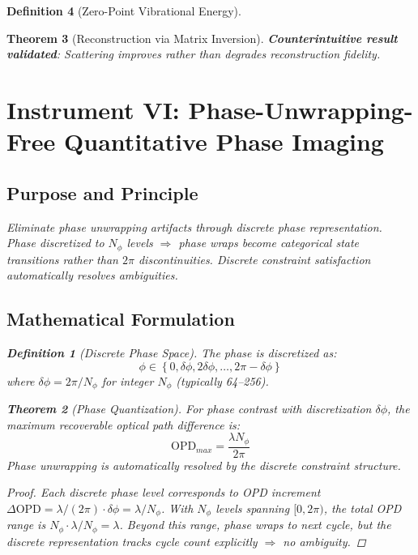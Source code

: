 \documentclass[11pt,a4paper]{article}
\newtheorem{theorem}{Theorem}[section]
\theoremstyle{definition}
\newtheorem{definition}[theorem]{Definition}
\theoremstyle{remark}
\begin{document}
\begin{definition}[Zero-Point Vibrational Energy]
\begin{theorem}[Reconstruction via Matrix Inversion]
\textbf{Counterintuitive result validated}: Scattering improves rather than degrades reconstruction fidelity.

\section{Instrument VI: Phase-Unwrapping-Free Quantitative Phase Imaging}
\label{sec:instrument6}

\subsection{Purpose and Principle}

Eliminate phase unwrapping artifacts through discrete phase representation. Phase discretized to $N_\phi$ levels $\Rightarrow$ phase wraps become categorical state transitions rather than $2\pi$ discontinuities. Discrete constraint satisfaction automatically resolves ambiguities.

\subsection{Mathematical Formulation}

\begin{definition}[Discrete Phase Space]
\label{def:discrete_phase}
The phase is discretized as:
\begin{equation}
\phi \in \left\{0, \delta\phi, 2\delta\phi, \ldots, 2\pi - \delta\phi\right\}
\end{equation}
where $\delta\phi = 2\pi/N_\phi$ for integer $N_\phi$ (typically 64--256).
\end{definition}

\begin{theorem}[Phase Quantization]
\label{thm:phase_quantization}
For phase contrast with discretization $\delta\phi$, the maximum recoverable optical path difference is:
\begin{equation}
\text{OPD}_{max} = \frac{\lambda N_\phi}{2\pi}
\end{equation}
Phase unwrapping is automatically resolved by the discrete constraint structure.
\end{theorem}

\begin{proof}
Each discrete phase level corresponds to OPD increment $\Delta \text{OPD} = \lambda/(2\pi) \cdot \delta\phi = \lambda/N_\phi$. With $N_\phi$ levels spanning $[0, 2\pi)$, the total OPD range is $N_\phi \cdot \lambda/N_\phi = \lambda$. Beyond this range, phase wraps to next cycle, but the discrete representation tracks cycle count explicitly $\Rightarrow$ no ambiguity.
\end{proof}


\end{theorem}
\end{definition}
\end{document}
